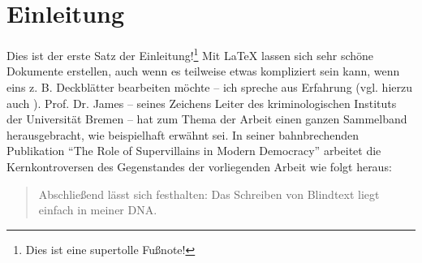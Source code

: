\documentclass[
sansserifheadings, %
acrosingle, %
]{politikunibremen}
\begin{document}
  







\Inhaltsverzeichnis %

\Abkuerzungsverzeichnis %


\nocite{*} %

\section{Einleitung}
        
Dies ist der erste Satz der Einleitung!\footnote{Dies ist eine supertolle Fußnote!} Mit \ac{LaTeX} lassen sich sehr schöne Dokumente erstellen, auch wenn es teilweise etwas kompliziert sein kann, wenn eins z. B. Deckblätter bearbeiten möchte -- ich spreche aus Erfahrung (vgl. hierzu auch \citealt{Weller.1994, Moriarty.2011}). Prof. Dr. James \citet{Moriarty.2011b} -- seines Zeichens Leiter des kriminologischen Instituts der Universität Bremen -- hat zum Thema der Arbeit einen ganzen Sammelband herausgebracht, wie beispielhaft erwähnt sei. In seiner bahnbrechenden Publikation \enquote{The Role of Supervillains in Modern Democracy} arbeitet \citet{Moriarty.2011} die Kernkontroversen des Gegenstandes der vorliegenden Arbeit wie folgt heraus:   

\begin{quote}
\blindtext Abschließend lässt sich festhalten: Das Schreiben von Blindtext liegt einfach in meiner \ac{DNA}.
\end{quote} 
\blindtext
\end{document}
